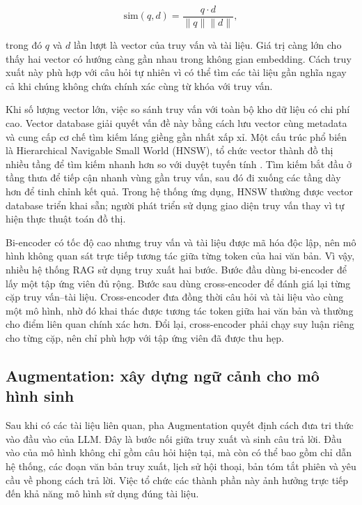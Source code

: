 \documentclass[a4paper,13pt,twoside]{report}
\begin{document}
\begin{equation}
    \mathrm{sim}(q,d)
    =
    \frac{q \cdot d}{\lVert q\rVert\lVert d\rVert},
\end{equation}

trong đó \(q\) và \(d\) lần lượt là vector của truy vấn và tài liệu. Giá trị càng lớn cho thấy hai vector có hướng càng gần nhau trong không gian embedding. Cách truy xuất này phù hợp với câu hỏi tự nhiên vì có thể tìm các tài liệu gần nghĩa ngay cả khi chúng không chứa chính xác cùng từ khóa với truy vấn.

Khi số lượng vector lớn, việc so sánh truy vấn với toàn bộ kho dữ liệu có chi phí cao. Vector database giải quyết vấn đề này bằng cách lưu vector cùng metadata và cung cấp cơ chế tìm kiếm láng giềng gần nhất xấp xỉ. Một cấu trúc phổ biến là Hierarchical Navigable Small World (HNSW), tổ chức vector thành đồ thị nhiều tầng để tìm kiếm nhanh hơn so với duyệt tuyến tính \cite{hnsw}. Tìm kiếm bắt đầu ở tầng thưa để tiếp cận nhanh vùng gần truy vấn, sau đó đi xuống các tầng dày hơn để tinh chỉnh kết quả. Trong hệ thống ứng dụng, HNSW thường được vector database triển khai sẵn; người phát triển sử dụng giao diện truy vấn thay vì tự hiện thực thuật toán đồ thị.

Bi-encoder có tốc độ cao nhưng truy vấn và tài liệu được mã hóa độc lập, nên mô hình không quan sát trực tiếp tương tác giữa từng token của hai văn bản. Vì vậy, nhiều hệ thống RAG sử dụng truy xuất hai bước. Bước đầu dùng bi-encoder để lấy một tập ứng viên đủ rộng. Bước sau dùng cross-encoder để đánh giá lại từng cặp truy vấn--tài liệu. Cross-encoder đưa đồng thời câu hỏi và tài liệu vào cùng một mô hình, nhờ đó khai thác được tương tác token giữa hai văn bản và thường cho điểm liên quan chính xác hơn. Đổi lại, cross-encoder phải chạy suy luận riêng cho từng cặp, nên chỉ phù hợp với tập ứng viên đã được thu hẹp.

\subsection{Augmentation: xây dựng ngữ cảnh cho mô hình sinh}

Sau khi có các tài liệu liên quan, pha Augmentation quyết định cách đưa tri thức vào đầu vào của LLM. Đây là bước nối giữa truy xuất và sinh câu trả lời. Đầu vào của mô hình không chỉ gồm câu hỏi hiện tại, mà còn có thể bao gồm chỉ dẫn hệ thống, các đoạn văn bản truy xuất, lịch sử hội thoại, bản tóm tắt phiên và yêu cầu về phong cách trả lời. Việc tổ chức các thành phần này ảnh hưởng trực tiếp đến khả năng mô hình sử dụng đúng tài liệu.
\end{document}
